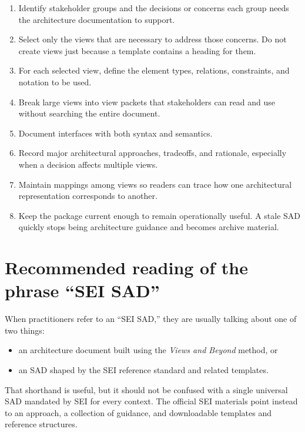 \documentclass[11pt]{article}
\begin{document}
\begin{enumerate}
    \item Identify stakeholder groups and the decisions or concerns each group needs the architecture documentation to support.\cite{sei-ref-standard}
    \item Select only the views that are necessary to address those concerns. Do not create views just because a template contains a heading for them.\cite{sei-layers,sei-vb-factsheet}
    \item For each selected view, define the element types, relations, constraints, and notation to be used.\cite{sei-ref-standard}
    \item Break large views into view packets that stakeholders can read and use without searching the entire document.\cite{sei-ref-standard}
    \item Document interfaces with both syntax and semantics.\cite{sei-interfaces}
    \item Record major architectural approaches, tradeoffs, and rationale, especially when a decision affects multiple views.\cite{sei-ref-standard}
    \item Maintain mappings among views so readers can trace how one architectural representation corresponds to another.\cite{sei-ref-standard}
    \item Keep the package current enough to remain operationally useful. A stale SAD quickly stops being architecture guidance and becomes archive material.\cite{sei-book-page}
\end{enumerate}

\section*{Recommended reading of the phrase ``SEI SAD''}

When practitioners refer to an ``SEI SAD,'' they are usually talking about one of two things:

\begin{itemize}
    \item an architecture document built using the \emph{Views and Beyond} method, or
    \item an SAD shaped by the SEI reference standard and related templates.
\end{itemize}

That shorthand is useful, but it should not be confused with a single universal SAD mandated by SEI for every context. The official SEI materials point instead to an approach, a collection of guidance, and downloadable templates and reference structures.\cite{sei-vb-collection,sei-template,sei-ref-standard}
\end{document}
